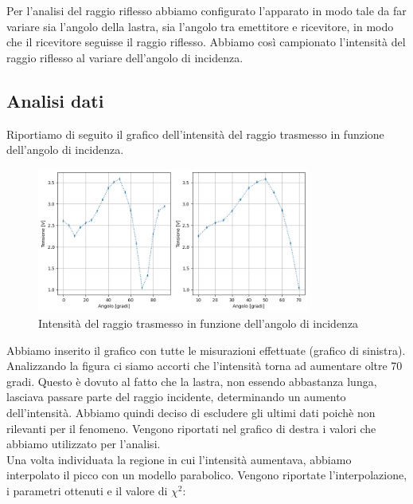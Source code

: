 \documentclass[letterpaper,12pt]{article}
\begin{document}
Per l'analisi del raggio riflesso abbiamo configurato l'apparato in modo tale da far variare sia l'angolo della lastra,
sia l'angolo tra emettitore e ricevitore, in modo che il ricevitore seguisse il raggio riflesso. Abbiamo così campionato
l'intensità del raggio riflesso al variare dell'angolo di incidenza.\\

\subsection{Analisi dati}

Riportiamo di seguito il grafico dell'intensità del raggio trasmesso in funzione dell'angolo di incidenza.\\
\begin{figure}[h!]
	\centering
	\includegraphics[width = 0.8\textwidth]{trasmesso.png}
	\caption{Intensità del raggio trasmesso in funzione dell'angolo di incidenza}
	\label{fig:trasmesso}
\end{figure}

Abbiamo inserito il grafico con tutte le misurazioni effettuate (grafico di sinistra). Analizzando la figura ci
siamo accorti che l'intensità torna ad aumentare oltre 70 gradi. Questo è dovuto al fatto che la lastra, non essendo
abbastanza lunga, lasciava passare parte del raggio incidente, determinando un aumento dell'intensità. Abbiamo quindi
deciso di escludere gli ultimi dati poichè non rilevanti per il fenomeno. Vengono riportati nel grafico di destra
i valori che abbiamo utilizzato per l'analisi.\\
Una volta individuata la regione in cui l'intensità aumentava, abbiamo interpolato il picco con un modello parabolico.
Vengono riportate l'interpolazione, i parametri ottenuti e il valore di $\chi^2$:
\end{document}
